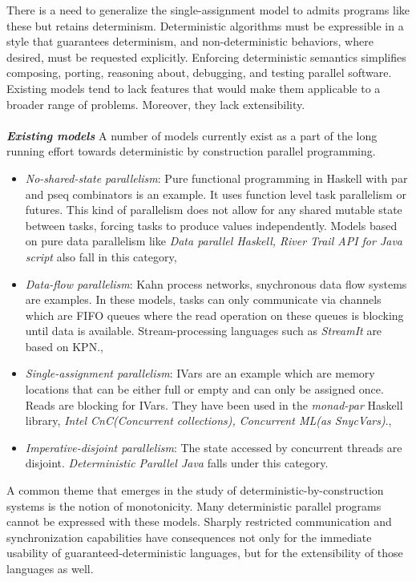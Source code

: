 \documentclass[twocolumn]{article}
\begin{document}
There is a need to generalize the single-assignment model to admits programs like these but retains determinism. Deterministic algorithms must be expressible in a style that guarantees determinism, and non-deterministic behaviors, where desired, must be requested explicitly. Enforcing deterministic semantics simplifies composing, porting, reasoning about, debugging, and testing parallel software. Existing models tend to lack features that would make them applicable to a broader range of problems. Moreover, they lack extensibility. \\ \\
\textit{\textbf{Existing models}}\cite{kuper} A number of models currently exist as a part of the long running effort towards deterministic by construction parallel programming. \par
\begin{itemize}
        \item \textit{No-shared-state parallelism}: Pure functional programming in Haskell with par and pseq combinators is an example. It uses function level task parallelism or futures. This kind of parallelism does not allow for any shared mutable state between tasks, forcing tasks to produce values independently. Models based on pure data parallelism like \textit{Data parallel Haskell, River Trail API for Java script} also fall in this category,
        \item \textit{Data-flow parallelism}: Kahn process networks, snychronous data flow systems are examples. In these models, tasks can only communicate via channels which are FIFO queues where the read operation on these queues is blocking until data is available. Stream-processing languages such as \textit{StreamIt} are based on KPN., 
        \item \textit{Single-assignment parallelism}: IVars are an example which are memory locations that can be either full or empty and can only be assigned once. Reads are blocking for IVars. They have been used in the \textit{monad-par} Haskell library, \textit{Intel CnC(Concurrent collections), Concurrent ML(as SnycVars)}.,
        \item \textit{Imperative-disjoint parallelism}: The state accessed by concurrent threads are disjoint. \textit{Deterministic Parallel Java} falls under this category.     
\end{itemize} 
A common theme that emerges in the study of deterministic-by-construction systems is the notion of monotonicity. Many deterministic parallel programs cannot be expressed with these models. Sharply restricted communication and synchronization capabilities have consequences not only for the immediate usability of guaranteed-deterministic languages, but for the extensibility of those languages as well.
\end{document}
